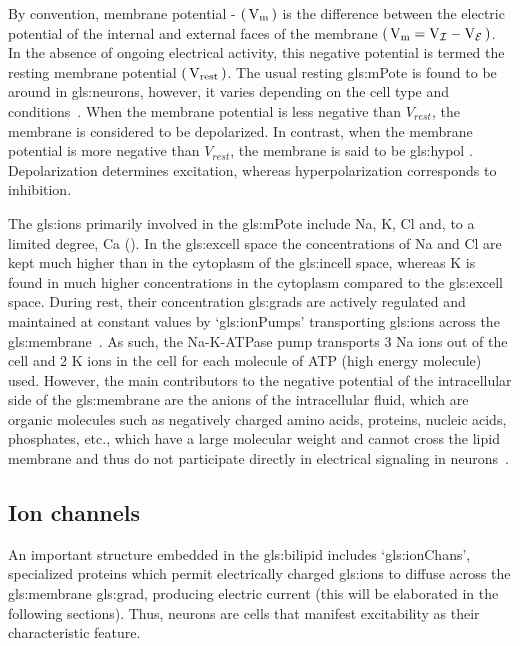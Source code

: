 \documentclass[class={myRUCProject}, crop=false]{standalone}
\begin{document}
By convention, membrane potential - \(\br{\unit{\V\membrane}}\) is the difference between the electric potential of the internal and external faces of the membrane \(\br{\unit{\V\membrane}=\unit{\V\incell}-\unit{\V\excell}}\). In the absence of ongoing electrical activity, this negative potential is termed the resting membrane potential \(\br{\unit{V_{rest}}}\). The usual resting \gls{gls:mPote} is found to be around  in \glspl{gls:neuron}, however, it varies depending on the cell type and conditions~\cite{Hammond2015ch3,Hammond2015ch4}. When the membrane potential is less negative than \(V_{rest}\), the membrane is considered to be depolarized. In contrast, when the membrane potential is more negative than \(V_{rest}\), the membrane is said to be \gls{gls:hypol} \cite{Hammond2015ch3}. Depolarization determines excitation, whereas hyperpolarization corresponds to inhibition.

The \glspl{gls:ion} primarily involved in the \gls{gls:mPote} include \gls{Na}, \gls{K}, \gls{Cl} and, to a limited degree, \gls{Ca} (\textbf{}). 
In the \gls{gls:excell} space the concentrations of \gls{Na} and \gls{Cl} are kept much higher than in the cytoplasm of the \gls{gls:incell} space, whereas \gls{K} is found in much higher concentrations in the cytoplasm compared to the \gls{gls:excell} space. 
During rest, their concentration \glspl{gls:grad} are actively regulated and maintained at constant values by `\glspl{gls:ionPump}' transporting \glspl{gls:ion} across the \gls{gls:membrane}~\cite{Hammond2015ch3,Hammond2015ch4}. As such, the Na-K-ATPase pump transports 3 \gls{Na} ions out of the cell and 2 \gls{K} ions in the cell for each molecule of ATP (high energy molecule) used.
However, the main contributors to the negative potential of the intracellular side of the \gls{gls:membrane} are the anions of the intracellular fluid, which are organic molecules such as negatively charged amino acids, proteins, nucleic acids, phosphates, etc., which have a large molecular weight and cannot cross the lipid membrane and thus do not participate directly in electrical signaling in neurons~\cite{Hammond2015ch3}. 

\subsection{Ion channels}
An important structure embedded in the \gls{gls:bilipid} includes `\glspl{gls:ionChan}', specialized proteins which permit electrically charged \glspl{gls:ion} to diffuse across the \gls{gls:membrane} \gls{gls:grad}, producing electric current (this will be elaborated in the following sections). Thus, neurons are cells that manifest excitability as their characteristic feature. 
\end{document}
